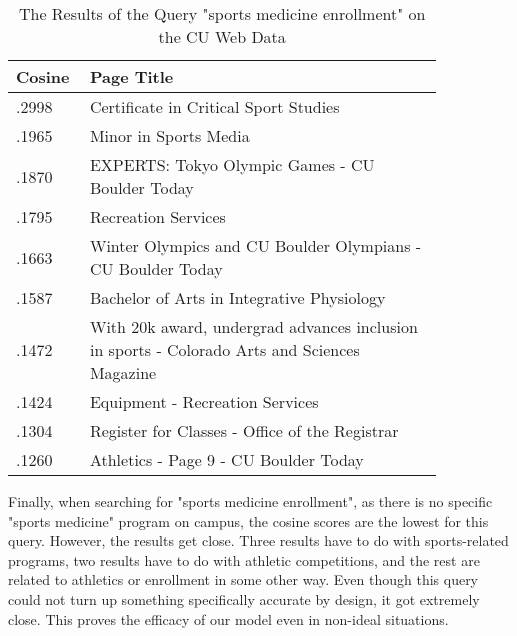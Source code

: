 \begin{table}[H]
\centering
\begin{tabular}{|p{0.1\linewidth} | p{0.75\linewidth}|}
\hline
\textbf{Cosine} & \textbf{Page Title} \\ \hline
.2998        & Certificate in Critical Sport Studies \\ \hline
.1965        & Minor in Sports Media \\ \hline
.1870        & EXPERTS: Tokyo Olympic Games - CU Boulder Today \\ \hline
.1795        & Recreation Services \\ \hline
.1663        & Winter Olympics and CU Boulder Olympians - CU Boulder Today \\ \hline
.1587        & Bachelor of Arts in Integrative Physiology \\ \hline
.1472        & With 20k award, undergrad advances inclusion in sports - Colorado Arts and Sciences Magazine \\ \hline
.1424        & Equipment - Recreation Services \\ \hline
.1304        & Register for Classes - Office of the Registrar \\ \hline
.1260        & Athletics - Page 9 - CU Boulder Today \\ \hline
\end{tabular}
\caption{The Results of the Query "sports medicine enrollment" on the CU Web Data}
\label{table:queryenrollment}
\end{table}

Finally, when searching for "sports medicine enrollment", as there is no specific "sports medicine" program on campus, the cosine scores are the lowest for this query. However, the results get close. Three results have to do with sports-related programs, two results have to do with athletic competitions, and the rest are related to athletics or enrollment in some other way. Even though this query could not turn up something specifically accurate by design, it got extremely close. This proves the efficacy of our model even in non-ideal situations.






